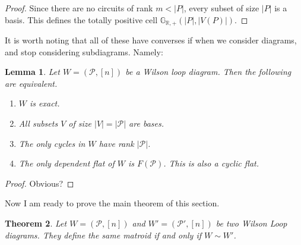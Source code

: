 \documentclass[11pt]{article}
\newcommand{\R}{\mathbb{R}}
\newcommand{\Grtnn}{\mathbb{G}_{\R, +}}
\newcommand{\cP}{\mathcal{P}}
\newtheorem{thm}{Theorem}[section]
\newtheorem{lem}[thm]{Lemma}
\theoremstyle{remark}
\theoremstyle{definition}
\newtheorem{rmk}[thm]{Remark}
\begin{document}
\begin{proof}
Since there are no circuits of rank $m < |P|$, every subset of size $|P|$ is a basis. This defines the totally positive cell $\Grtnn(|P|, |V(P)|)$.
\end{proof}


It is worth noting that all of these have converses if when we consider diagrams, and stop considering subdiagrams. Namely:

\begin{lem}\label{exactequivs}
Let $W = (\cP, [n])$ be a Wilson loop diagram. Then the following are equivalent. \begin{enumerate}
\item $W$ is exact.
\item All subsets $V$ of size $|V| = |\cP|$ are bases.
\item The only cycles in $W$ have rank $|\cP|$.
\item The only dependent flat of $W$ is $F(\cP)$. This is also a cyclic flat.
\end{enumerate}
\end{lem}

\begin{proof}
Obvious?
\end{proof}

Now I am ready to prove the main theorem of this section.

\begin{thm}
Let $W= (\cP, [n])$ and $W'= (\cP', [n])$ be two Wilson Loop diagrams. They define the same matroid if and only if $W \sim W'$.
\end{thm}
\end{document}
